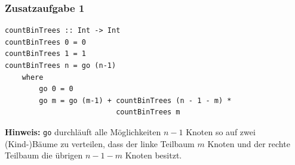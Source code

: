 \documentclass{beamer}
\begin{document}
	\begin{frame}[fragile] \frametitle{Zusatzaufgabe 1}
		\footnotesize
		\begin{lstlisting}[style=bg]
countBinTrees :: Int -> Int
countBinTrees 0 = 0
countBinTrees 1 = 1
countBinTrees n = go (n-1)
	where
		go 0 = 0
		go m = go (m-1) + countBinTrees (n - 1 - m) * 
		                  countBinTrees m
		\end{lstlisting}
		
		\textbf{Hinweis:} \texttt{go} durchläuft alle Möglichkeiten $n-1$ Knoten so auf zwei (Kind-)Bäume zu verteilen, dass der linke Teilbaum $m$ Knoten und der rechte Teilbaum die übrigen $n - 1 - m$ Knoten besitzt.
	\end{frame}


%
%	
%
%
%

%
\end{document}
